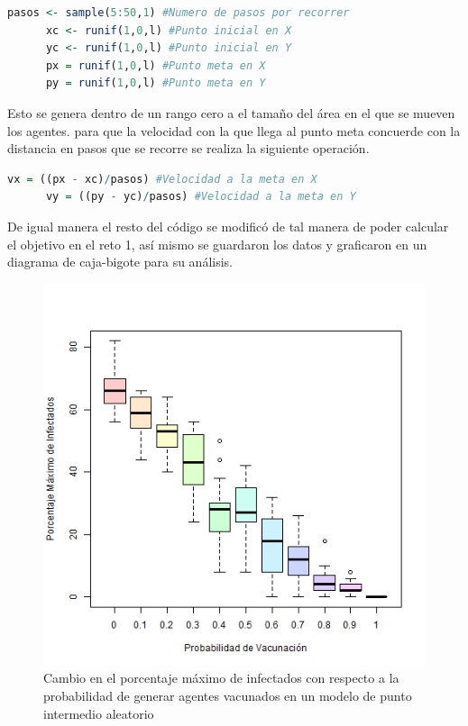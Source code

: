 \documentclass{article}
\begin{document}
\begin{lstlisting}[language=R]
pasos <- sample(5:50,1) #Numero de pasos por recorrer
      xc <- runif(1,0,l) #Punto inicial en X
      yc <- runif(1,0,l) #Punto inicial en Y
      px = runif(1,0,l) #Punto meta en X
      py = runif(1,0,l) #Punto meta en Y
 \end{lstlisting}

Esto se genera dentro de un rango cero a el tama\~no del \'area en el que se mueven los agentes. para que la velocidad con la que llega al punto meta concuerde con la distancia en pasos que se recorre se realiza la siguiente operaci\'on.

\begin{lstlisting}[language=R]
vx = ((px - xc)/pasos) #Velocidad a la meta en X
      vy = ((py - yc)/pasos) #Velocidad a la meta en Y
\end{lstlisting}

De igual manera el resto del c\'odigo se modific\'o de tal manera de poder calcular el objetivo en el reto 1, as\'i mismo se guardaron los datos y graficaron en un diagrama de caja-bigote para su an\'alisis.

\begin{figure}[H]
       \begin{center}
           \includegraphics[width=13cm]{BuenaR1.png}
\end{center}
\caption{Cambio en el porcentaje m\'aximo de infectados con respecto  a la probabilidad de generar agentes vacunados en un modelo de punto intermedio aleatorio}
        \label{f3}
\end{figure}
\end{document}
